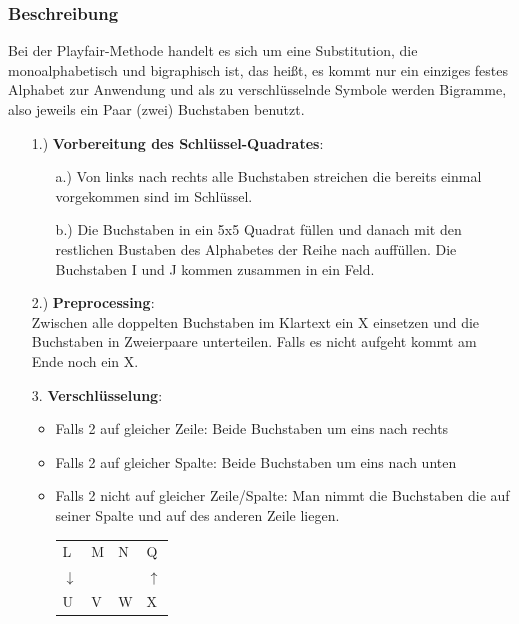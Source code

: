 \documentclass[10pt]{article}
\begin{document}
\subsubsection{Beschreibung}
Bei der Playfair-Methode handelt es sich um eine Substitution, die monoalphabetisch und bigraphisch ist, das heißt, es kommt nur ein einziges  festes Alphabet zur Anwendung und als zu verschlüsselnde Symbole werden Bigramme, also jeweils ein Paar (zwei) Buchstaben benutzt.
\begin{itemize}
	\item[1.)] \textbf{Vorbereitung des Schlüssel-Quadrates}:
		\begin{itemize}
			\item[a.)] Von links nach rechts alle Buchstaben streichen die bereits einmal vorgekommen sind im Schlüssel.
			\item[b.)] Die Buchstaben in ein 5x5 Quadrat füllen und danach mit den restlichen Bustaben des Alphabetes der Reihe nach auffüllen. Die Buchstaben I und J kommen zusammen in ein Feld.
		\end{itemize}
	\item[2.)] \textbf{Preprocessing}: \\
		Zwischen alle doppelten Buchstaben im Klartext ein X einsetzen und die Buchstaben in Zweierpaare unterteilen. Falls es nicht aufgeht kommt am Ende noch ein X.
	\item[3.] \textbf{Verschlüsselung}:
		\begin{itemize}
 			\item Falls 2 auf gleicher Zeile: Beide Buchstaben um eins nach rechts
			\item Falls 2 auf gleicher Spalte: Beide Buchstaben um eins nach unten
			\item Falls 2 nicht auf gleicher Zeile/Spalte: Man nimmt die Buchstaben die auf seiner Spalte und auf des anderen Zeile liegen.\\
				\begin{tabular}{llll}
  					L&M&N&Q\\
					$\downarrow$&&&$\uparrow$\\
  					U&V&W&X\\
				\end{tabular}
		\end{itemize}
\end{itemize}
\end{document}
